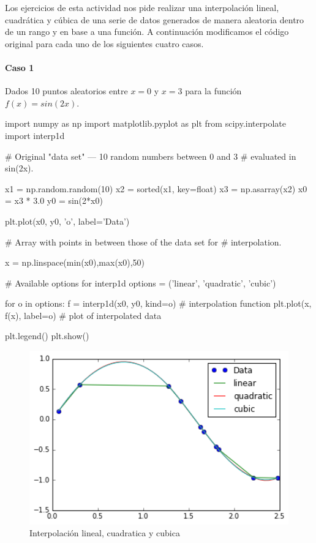 \documentclass[12pt,spanish]{article}
\begin{document}
\bigskip

Los ejercicios de esta actividad nos pide realizar una interpolación lineal, cuadrática y cúbica de una serie de datos generados de manera aleatoria dentro de un rango y en base a una función. A continuación modificamos el código original para cada uno de los siguientes cuatro casos.

\newpage

\paragraph{Caso 1}

Dados 10 puntos aleatorios entre $x=0$ y $x=3$ para la función $f(x) = sin(2 x)$.

\begin{center}
\begin{boxedverbatim}

import numpy as np
import matplotlib.pyplot as plt
from scipy.interpolate import interp1d

# Original "data set" --- 10 random numbers between 0 and 3 
# evaluated in sin(2x).

x1 = np.random.random(10)
x2 = sorted(x1, key=float)
x3 = np.asarray(x2)
x0 = x3 * 3.0
y0 = sin(2*x0)

plt.plot(x0, y0, 'o', label='Data')

# Array with points in between those of the data set for
# interpolation.

x = np.linspace(min(x0),max(x0),50)

# Available options for interp1d
options = ('linear', 'quadratic', 'cubic')

for o in options:
    f = interp1d(x0, y0, kind=o)  # interpolation function
    plt.plot(x, f(x), label=o)    # plot of interpolated data

plt.legend()
plt.show()
\end{boxedverbatim}
\end{center}

\begin{figure}[H]
    \centering
	\includegraphics[height=7.5cm]{caso1.png}
    \caption{Interpolación lineal, cuadratica y cubica}
\end{figure}
\end{document}
